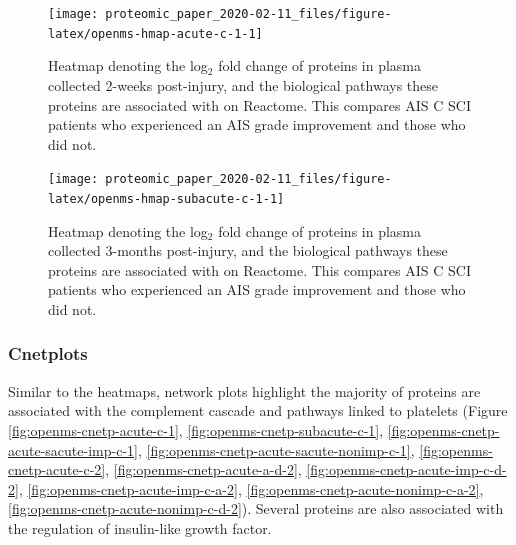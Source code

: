 \documentclass[
]{article}
\begin{document}
\begin{SidewaysFigure}



\begin{figure}

{\centering \texttt{[image: proteomic\_paper\_2020-02-11\_files/figure-latex/openms-hmap-acute-c-1-1]} 

}

\caption{Heatmap denoting the log$_2$ fold change of proteins in plasma collected 2-weeks post-injury, and the biological pathways these proteins are associated with on Reactome. This compares AIS C SCI patients who experienced an AIS grade improvement and those who did not.}\label{fig:openms-hmap-acute-c-1}
\end{figure}

\end{SidewaysFigure}
\begin{SidewaysFigure}



\begin{figure}

{\centering \texttt{[image: proteomic\_paper\_2020-02-11\_files/figure-latex/openms-hmap-subacute-c-1-1]} 

}

\caption{Heatmap denoting the log$_2$ fold change of proteins in plasma collected 3-months post-injury, and the biological pathways these proteins are associated with on Reactome. This compares AIS C SCI patients who experienced an AIS grade improvement and those who did not.}\label{fig:openms-hmap-subacute-c-1}
\end{figure}

\end{SidewaysFigure}
\clearpage

\hypertarget{cnetplot-chap3}{%
\subsubsection{Cnetplots}\label{cnetplot-chap3}}

Similar to the heatmaps, network plots highlight the majority of proteins are associated with the complement cascade and pathways linked to platelets (Figure \ref{fig:openms-cnetp-acute-c-1}, \ref{fig:openms-cnetp-subacute-c-1}, \ref{fig:openms-cnetp-acute-sacute-imp-c-1}, \ref{fig:openms-cnetp-acute-sacute-nonimp-c-1}, \ref{fig:openms-cnetp-acute-c-2}, \ref{fig:openms-cnetp-acute-a-d-2}, \ref{fig:openms-cnetp-acute-imp-c-d-2}, \ref{fig:openms-cnetp-acute-imp-c-a-2}, \ref{fig:openms-cnetp-acute-nonimp-c-a-2}, \ref{fig:openms-cnetp-acute-nonimp-c-d-2}).
Several proteins are also associated with the regulation of insulin-like growth factor.
\end{document}
